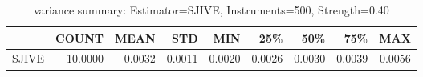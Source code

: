 \begin{table}[ht]
\centering
\caption{variance summary: Estimator=SJIVE, Instruments=500, Strength=0.40}
\begin{tabular}{lrrrrrrrr}
\toprule
 & COUNT & MEAN & STD & MIN & 25\% & 50\% & 75\% & MAX \\
\midrule
SJIVE & 10.0000 & 0.0032 & 0.0011 & 0.0020 & 0.0026 & 0.0030 & 0.0039 & 0.0056 \\
\bottomrule
\end{tabular}
\end{table}
